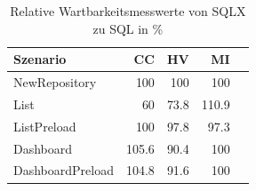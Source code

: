 \begin{table}[ht]
\centering
\caption{Relative Wartbarkeitsmesswerte von SQLX zu SQL in \%}
\begin{tabular}{lrrrr}
\toprule
Szenario & CC & HV & MI \\
\midrule
	NewRepository &  100 &  100 &  100 \\
	List & \cellcolor{green!26}  60 & \cellcolor{green!20}  73.8 & \cellcolor{green!14}  110.9 \\
	ListPreload &  100 & \cellcolor{green!11}  97.8 & \cellcolor{red!11}  97.3 \\
	Dashboard & \cellcolor{red!12}  105.6 & \cellcolor{green!14}  90.4 &  100 \\
	DashboardPreload & \cellcolor{red!12}  104.8 & \cellcolor{green!13}  91.6 &  100 \\
\bottomrule
\end{tabular}
\label{tab:wartbarkeit_relativ_sqlx}
\end{table}
	